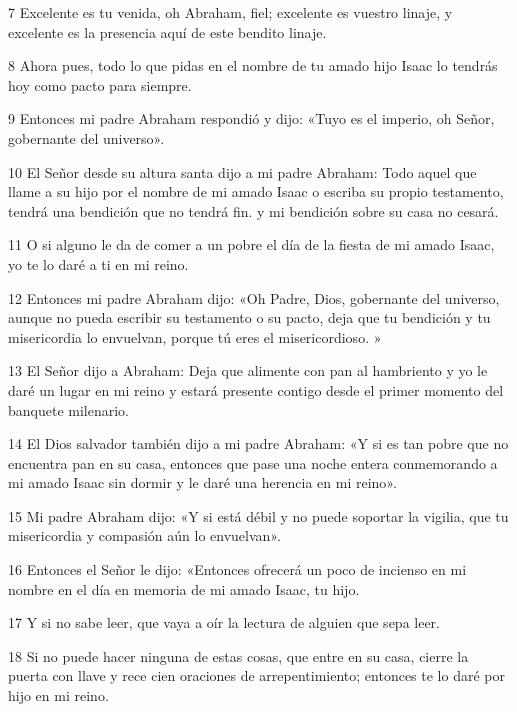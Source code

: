 \par 7 Excelente es tu venida, oh Abraham, fiel; excelente es vuestro linaje, y excelente es la presencia aquí de este bendito linaje.

\par 8 Ahora pues, todo lo que pidas en el nombre de tu amado hijo Isaac lo tendrás hoy como pacto para siempre.

\par 9 Entonces mi padre Abraham respondió y dijo: «Tuyo es el imperio, oh Señor, gobernante del universo».

\par 10 El Señor desde su altura santa dijo a mi padre Abraham: Todo aquel que llame a su hijo por el nombre de mi amado Isaac o escriba su propio testamento, tendrá una bendición que no tendrá fin. y mi bendición sobre su casa no cesará.

\par 11 O si alguno le da de comer a un pobre el día de la fiesta de mi amado Isaac, yo te lo daré a ti en mi reino.

\par 12 Entonces mi padre Abraham dijo: «Oh Padre, Dios, gobernante del universo, aunque no pueda escribir su testamento o su pacto, deja que tu bendición y tu misericordia lo envuelvan, porque tú eres el misericordioso. »

\par 13 El Señor dijo a Abraham: Deja que alimente con pan al hambriento y yo le daré un lugar en mi reino y estará presente contigo desde el primer momento del banquete milenario.

\par 14 El Dios salvador también dijo a mi padre Abraham: «Y si es tan pobre que no encuentra pan en su casa, entonces que pase una noche entera conmemorando a mi amado Isaac sin dormir y le daré una herencia en mi reino».

\par 15 Mi padre Abraham dijo: «Y si está débil y no puede soportar la vigilia, que tu misericordia y compasión aún lo envuelvan».

\par 16 Entonces el Señor le dijo: «Entonces ofrecerá un poco de incienso en mi nombre en el día en memoria de mi amado Isaac, tu hijo.

\par 17 Y si no sabe leer, que vaya a oír la lectura de alguien que sepa leer.

\par 18 Si no puede hacer ninguna de estas cosas, que entre en su casa, cierre la puerta con llave y rece cien oraciones de arrepentimiento; entonces te lo daré por hijo en mi reino.

